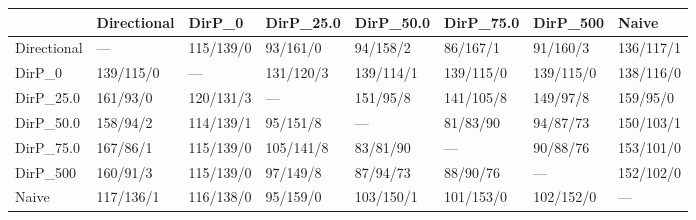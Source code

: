 \begin{tabular}{llllllll}
\toprule
{} & Directional &     DirP\_0 &  DirP\_25.0 &  DirP\_50.0 &  DirP\_75.0 &   DirP\_500 &      Naive \\
\midrule
Directional &         --- &  115/139/0 &   93/161/0 &   94/158/2 &   86/167/1 &   91/160/3 &  136/117/1 \\
DirP\_0      &   139/115/0 &        --- &  131/120/3 &  139/114/1 &  139/115/0 &  139/115/0 &  138/116/0 \\
DirP\_25.0   &    161/93/0 &  120/131/3 &        --- &   151/95/8 &  141/105/8 &   149/97/8 &   159/95/0 \\
DirP\_50.0   &    158/94/2 &  114/139/1 &   95/151/8 &        --- &   81/83/90 &   94/87/73 &  150/103/1 \\
DirP\_75.0   &    167/86/1 &  115/139/0 &  105/141/8 &   83/81/90 &        --- &   90/88/76 &  153/101/0 \\
DirP\_500    &    160/91/3 &  115/139/0 &   97/149/8 &   87/94/73 &   88/90/76 &        --- &  152/102/0 \\
Naive       &   117/136/1 &  116/138/0 &   95/159/0 &  103/150/1 &  101/153/0 &  102/152/0 &        --- \\
\bottomrule
\end{tabular}
